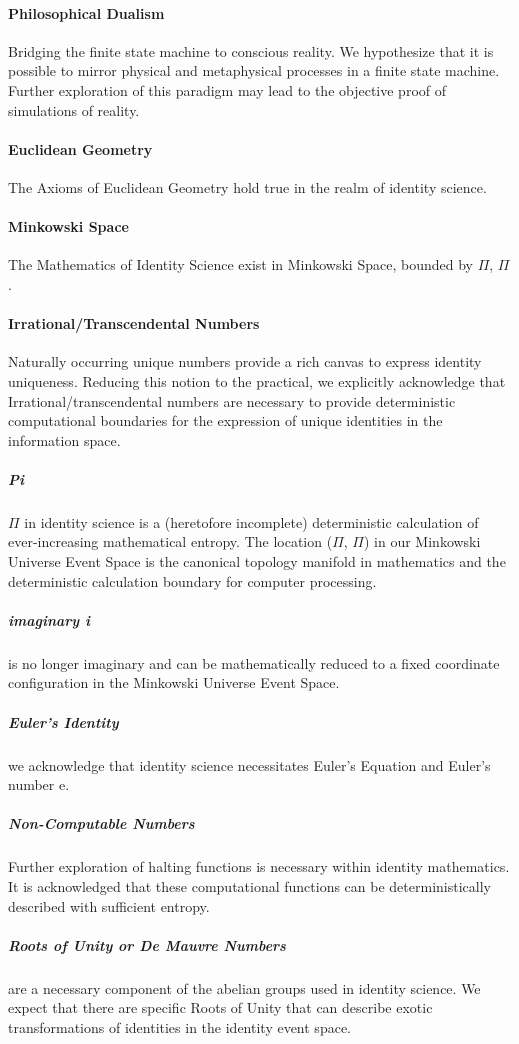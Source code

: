 \documentclass{article}
\begin{document}
		\paragraph{Philosophical Dualism} Bridging the finite state machine to conscious reality.  We hypothesize that it is possible to mirror physical and metaphysical processes in a finite state machine.  Further exploration of this paradigm may lead to the objective proof of simulations of reality.
		\paragraph{Euclidean Geometry} The Axioms of Euclidean Geometry hold true in the realm of identity science.
		\paragraph{Minkowski Space} The Mathematics of Identity Science exist in Minkowski Space, bounded by $\Pi$, $\Pi$.
		\paragraph{Irrational/Transcendental Numbers}  Naturally occurring unique numbers provide a rich canvas to express identity uniqueness.  Reducing this notion to the practical, we explicitly acknowledge that Irrational/transcendental numbers are necessary to provide deterministic computational boundaries for the expression of unique identities in the information space.
			\subparagraph{Pi} $\Pi$ in identity science is a (heretofore incomplete) deterministic calculation of ever-increasing mathematical entropy.  The location ($\Pi$, $\Pi$) in our Minkowski Universe Event Space is the canonical topology manifold in mathematics and the deterministic calculation boundary for computer processing.
			\subparagraph{imaginary i} is no longer imaginary and can be mathematically reduced to a fixed coordinate configuration in the Minkowski Universe Event Space.
			\subparagraph{Euler's Identity} we acknowledge that identity science necessitates Euler's Equation and Euler's number e.  
			\subparagraph{Non-Computable Numbers}  Further exploration of halting functions is necessary within identity mathematics.  It is acknowledged that these computational functions can be deterministically described with sufficient entropy. 
			\subparagraph{Roots of Unity or De Mauvre Numbers}  are a necessary component of the abelian groups used in identity science.  We expect that there are specific Roots of Unity that can describe exotic transformations of identities in the identity event space.
\end{document}
